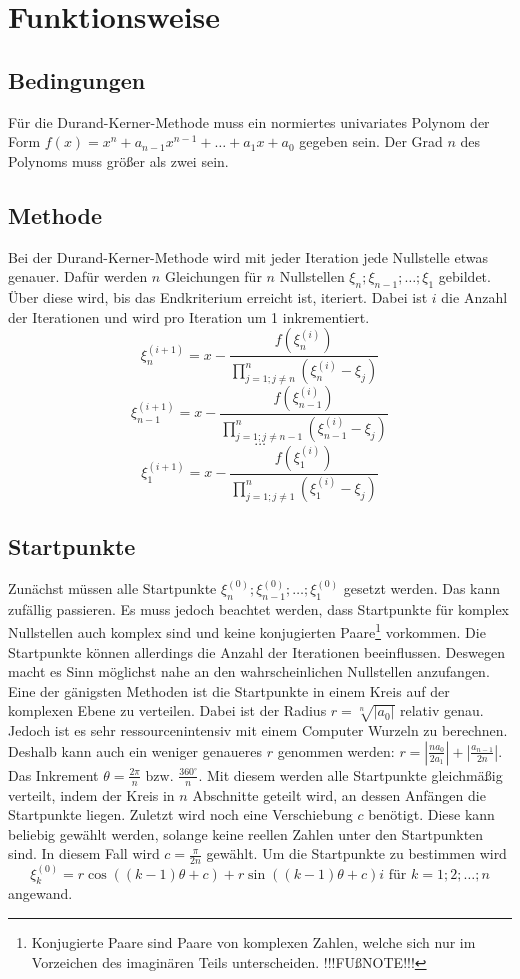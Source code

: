 \documentclass[12pt]{article}
\begin{document}
\section{Funktionsweise}
\subsection{Bedingungen}
Für die Durand-Kerner-Methode muss ein normiertes univariates Polynom der Form $f(x) = x^n + a_{n-1} x^{n-1} + \dots + a_1 x + a_0$ gegeben sein. Der Grad $n$ des Polynoms muss größer als zwei sein.

\subsection{Methode}
Bei der Durand-Kerner-Methode wird mit jeder Iteration jede Nullstelle etwas genauer. Dafür werden $n$ Gleichungen für $n$ Nullstellen $\xi_n;\xi_{n-1};\dots;\xi_1$ gebildet. Über diese wird, bis das Endkriterium erreicht ist, iteriert. Dabei ist $i$ die Anzahl der Iterationen und wird pro Iteration um 1 inkrementiert.
\[\xi_n^{(i+1)} = x - \frac{f(\xi_n^{(i)})}{\prod_{j=1;j\neq n}^{n}(\xi_n^{(i)}-\xi_j)}\]
\[\xi_{n-1}^{(i+1)} = x - \frac{f(\xi_{n-1}^{(i)})}{\prod_{j=1;j\neq n-1}^{n}(\xi_{n-1}^{(i)}-\xi_j)}\]
\vspace{0.25mm}
\[\dots\]
\[\xi_{1}^{(i+1)} = x - \frac{f(\xi_{1}^{(i)})}{\prod_{j=1;j\neq 1}^{n}(\xi_{1}^{(i)}-\xi_j)}\]
\subsection{Startpunkte}
Zunächst müssen alle Startpunkte $\xi_n^{(0)};\xi_{n-1}^{(0)};\dots;\xi_1^{(0)}$ gesetzt werden. Das kann zufällig passieren. Es muss jedoch beachtet werden, dass Startpunkte für komplex Nullstellen auch komplex sind und keine konjugierten Paare\footnote{Konjugierte Paare sind Paare von komplexen Zahlen, welche sich nur im Vorzeichen des imaginären Teils unterscheiden. !!!FUßNOTE!!!} vorkommen. Die Startpunkte können allerdings die Anzahl der Iterationen beeinflussen. Deswegen macht es Sinn möglichst nahe an den wahrscheinlichen Nullstellen anzufangen. Eine der gänigsten Methoden ist die Startpunkte in einem Kreis auf der komplexen Ebene zu verteilen. Dabei ist der Radius $r = \sqrt[n]{|a_0|}$ relativ genau. Jedoch ist es sehr ressourcenintensiv mit einem Computer Wurzeln zu berechnen. Deshalb kann auch ein weniger genaueres $r$ genommen werden: $r = |\frac{na_0}{2a_1}| + |\frac{a_{n-1}}{2n}|$.
Das Inkrement $\theta = \frac{2\pi}{n} \text{ bzw. } \frac{360^\circ}{n}$. Mit diesem werden alle Startpunkte gleichmäßig verteilt, indem der Kreis in $n$ Abschnitte geteilt wird, an dessen Anfängen die Startpunkte liegen. Zuletzt wird noch eine Verschiebung $c$ benötigt. Diese kann beliebig gewählt werden, solange keine reellen Zahlen unter den Startpunkten sind. In diesem Fall wird $c = \frac{\pi}{2n}$ gewählt.
Um die Startpunkte zu bestimmen wird 
\[\xi_{k}^{(0)} = r\cos((k-1)\theta+c)+r\sin((k-1)\theta+c)i \text{ für } k=1;2;\dots;n\]
 angewand.
\end{document}
